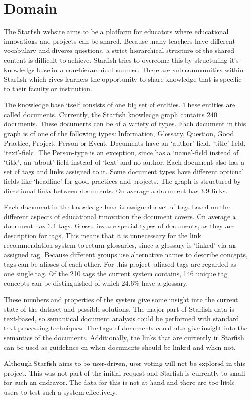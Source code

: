 

\section{Domain}
The Starfish website aims to be a platform for educators where educational innovations and projects can be shared. Because many teachers have different vocabulary and diverse questions, a strict hierarchical structure of the shared content is difficult to achieve. Starfish tries to overcome this by structuring it's knowledge base in a non-hierarchical manner. There are sub communities within Starfish which gives learners the opportunity to share knowledge that is specific to their faculty or institution. 

The knowledge base itself consists of one big set of entities. These entities are called documents. Currently, the Starfish knowledge graph contains 240 documents. These documents can be of a variety of types. Each document in this graph is of one of the following types: Information, Glossary, Question, Good Practice, Project, Person or Event. Documents have an `author'-field, `title'-field, `text'-field. The Person-type is an exception, since has a `name'-field instead of `title', an `about'-field instead of `text' and no author. Each document also has a set of tags and links assigned to it. Some document types have different optional fields like `headline' for good practices and projects. The graph is structured by directional links between documents.  On average a document has 3.9 links.

Each document in the knowledge base is assigned a set of tags based on the different aspects of educational innovation the document covers. On average a document has 3.4 tags. Glossaries are special types of documents, as they are description for tags. This means that it is unnecessary for the link recommendation system to return glossaries, since a glossary is `linked' via an assigned tag. Because different groups use alternative names to describe concepts, tags can be aliases of each other. For this project, aliased tags are regarded as one single tag. Of the 210 tags the current system contains, 146 unique tag concepts can be distinguished of which 24.6\% have a glossary. 

These numbers and properties of the system give some insight into the current
state of the dataset and possible solutions. The major part of Starfish data is
text-based, so semantical document analysis could be performed with standard
text processing techniques. The tags of documents could also give insight into
the semantics of the documents. Additionally, the links that are currently in
Starfish can be used as guidelines on when documents should be linked and when
not. 

Although Starfish aims to be user-driven, user voting will not be explored in this 
project. This was not part of the initial request and Starfish is currently to small 
for such an endeavor. The data for this is not at hand and there are too little
users to test such a system effectively. 